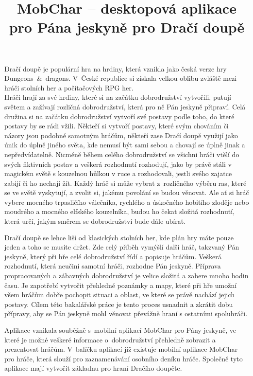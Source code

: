 \documentclass[thesis=B,czech]{resources/FITthesis}[2012/06/26]
\title{	MobChar -- desktopová aplikace pro Pána jeskyně pro Dračí doupě}
\begin{document}

\begin{introduction}
Dračí doupě je populární hra na hrdiny, která vznikla jako česká verze hry Dungeons~\&~dragons. V~České republice si získala velkou oblibu zvláště mezi hráči stolních her a počítačových RPG her.\\

Hráči hrají za své hrdiny, které si na začátku dobrodružství vytvořili, putují světem a zažívají rozličná dobrodružství, která pro ně Pán jeskyně připraví. Celá družina si na začátku dobrodružství vytvoří své postavy podle toho, do které postavy by se rádi vžili. Někteří si vytvoří postavy, které svým chováním či názory jsou podobné samotným hráčům, někteří zase Dračí doupě využijí jako únik do úplně jiného světa, kde nemusí být sami sebou a chovají se úplně jinak a nepředvídatelně. Nicméně během celého dobrodružství se všichni hráči vtělí do svých fiktivních postav a veškerá rozhodnutí rozhodují, jako by právě stáli v magickém světě s kouzelnou hůlkou v ruce a rozhodovali, jestli svého zajatce zabijí či ho nechají žít.
Každý hráč si může vybrat z~rozličného výběru ras, které se ve světě vyskytují, a zvolit si, jakému povolání se budou věnovat. Ale ať si hráč vybere mocného trpasličího válečníka, rychlého a úskočného hobitího zloděje nebo moudrého a mocného elfského kouzelníka, budou ho čekat složitá rozhodnutí, která určí, jakým směrem se dobrodružství bude dále ubírat. \par

Dračí doupě se lehce liší od klasických stolních her, kde plán hry máte pouze jeden a toho se musíte držet. Zde celý příběh vymýšlí další hráč, takzvaný Pán jeskyně, který při hře celé dobrodružství řídí a popisuje hráčům. Veškerá rozhodnutí, která neučiní samotní hráči, rozhodne Pán jeskyně. Příprava propracovaných a zábavných dobrodružství je velice složitá a zabere mnoho hodin času. Je zapotřebí vytvořit přehledné poznámky a mapy, které při hře umožní všem hráčům dobře pochopit situaci a oblast, ve které se právě nachází jejich postavy. Cílem této bakalářské práce je tento proces usnadnit a zkrátit dobu přípravy, aby se Pán jeskyně mohl věnovat převážně hraní s ostatními spoluhráči. \par

Aplikace vznikala souběžně s~mobilní aplikací MobChar pro Pány jeskyně\cite{Shanel_2017}, ve které je možné veškeré informace o~dobrodružství přehledně zobrazit a prezentovat hráčům. V~balíčku aplikací již existuje mobilní aplikace MobChar pro hráče, která slouží pro zaznamenávání osobního deníku hráče\cite{Weberova_2017}. Společně tyto aplikace mají vytvořit základnu pro hraní Dračího doupěte. 


\end{introduction}
\end{document}
